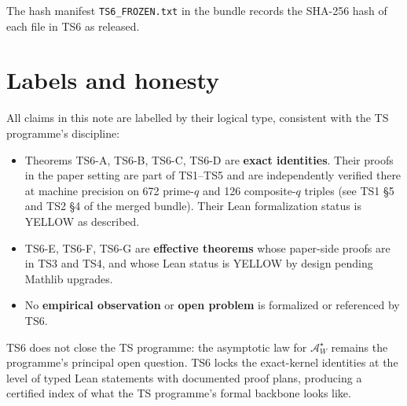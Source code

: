\documentclass[11pt,a4paper]{article}
\newcommand{\AWs}{\mathcal{A}_W^\star}
\begin{document}
The hash manifest \texttt{TS6\_FROZEN.txt} in the bundle records the
SHA-256 hash of each file in TS6 as released.

\section*{Labels and honesty}

All claims in this note are labelled by their logical type, consistent with
the TS programme's discipline:

\begin{itemize}[nosep,leftmargin=2em]
\item Theorems TS6-A, TS6-B, TS6-C, TS6-D are \textbf{exact identities}.
  Their proofs in the paper setting are part of TS1--TS5 and are
  independently verified there at machine precision on 672 prime-$q$ and
  126 composite-$q$ triples (see TS1 \S5 and TS2 \S4 of the merged
  bundle). Their Lean formalization status is YELLOW as described.
\item TS6-E, TS6-F, TS6-G are \textbf{effective theorems} whose
  paper-side proofs are in TS3 and TS4, and whose Lean status is YELLOW
  by design pending Mathlib upgrades.
\item No \textbf{empirical observation} or \textbf{open problem} is
  formalized or referenced by TS6.
\end{itemize}

TS6 does not close the TS programme: the asymptotic law for $\AWs$ remains
the programme's principal open question. TS6 locks the exact-kernel
identities at the level of typed Lean statements with documented proof
plans, producing a certified index of what the TS programme's formal
backbone looks like.
\end{document}
